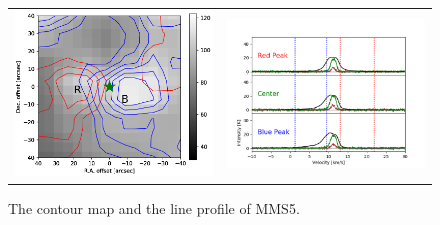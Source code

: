\begin{figure}[h!]
	\begin{center}
		\begin{tabular}{cc}
			\includegraphics[width=7cm]{Orion_12CO2-1_MMS5_rbcontour_400_modified} &   \includegraphics[width=7cm]{Orion_12CO2-1_MMS5_line_profile_400}
		\end{tabular}
		\caption{The contour map and the line profile of MMS5. }
	\label{fig:MMS521}
	\end{center}
\end{figure}

